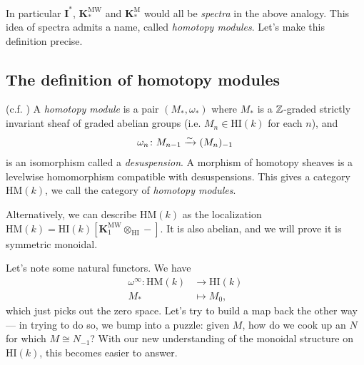 \documentclass[11pt,openany]{book}
\providecommand{\HI}{\mathrm{HI}}
\providecommand{\HM}{\mathrm{HM}}
\providecommand{\KM}{\mathbf{K}^\mathrm{M}}
\providecommand{\KMW}{\mathbf{K}^\mathrm{MW}}
\begin{document}
In particular $\mathbf{I}^\ast$, $\KMW_\ast$ and $\KM_\ast$ would all be \textit{spectra} in the above analogy. This idea of spectra admits a name, called \textit{homotopy modules}. Let's make this definition precise.

\subsection{The definition of homotopy modules}


\begin{definition} (c.f. \cite[3.4.1.2]{Feld-thesis}) A \textit{homotopy module} is a pair $(M_\ast, \omega_\ast)$ where $M_\ast$ is a $\mathbb{Z}$-graded strictly invariant sheaf of graded abelian groups (i.e. $M_n \in \HI(k)$ for each $n$), and
\begin{align*}
    \omega_n \colon M_{n-1} \xrightarrow{\sim} (M_n)_{-1}
\end{align*}
is an isomorphism called a \textit{desuspension}. A morphism of homotopy sheaves is a levelwise homomorphism compatible with desuspensions. This gives a category $\HM(k)$, we call the category of \textit{homotopy modules}.
\end{definition}

\begin{remark} Alternatively, we can describe $\HM(k)$ as the localization $\HM(k) = \HI(k) \left[ \KMW_1 \otimes_\HI - \right]$. It is also abelian, and we will prove it is symmetric monoidal.
\end{remark}

Let's note some natural functors. We have 
\begin{align*}
    \omega^\infty \colon \HM(k) &\to \HI(k) \\
    M_\ast &\mapsto M_0,
\end{align*}
which just picks out the zero space. Let's try to build a map back the other way --- in trying to do so, we bump into a puzzle: given $M$, how do we cook up an $N$ for which $M \cong N_{-1}$? With our new understanding of the monoidal structure on $\HI(k)$, this becomes easier to answer.
\end{document}

